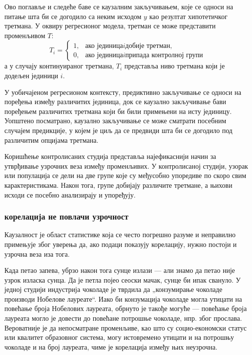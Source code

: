 \documentclass[12pt, a4paper]{article}
\begin{document}
Ово поглавље и следеће баве се каузалним закључивањем, које се односи на питање шта би се догодило са неким исходом $y$ као резултат хипотетичког третмана.
У оквиру регресионог модела, третман се може представити променљивом $T$:
$$
T_i =
\begin{cases}
1, & \text{ако јединица} i \text{добије третман},\\
0, & \text{ако јединица} i \text{припада контролној групи}
\end{cases}
$$
а у случају континуираног третмана, $T_i$ представља ниво третмана који је додељен јединици $i$.

У уобичајеном регресионом контексту, предиктивно закључивање се односи на поређења између различитих јединица, док се каузално закључивање бави 
поређењем различитих третмана који би били примењени на исту јединицу. Уопштено посматрано, каузално закључивање се може сматрати посебним случајем предикције, 
у којем је циљ да се предвиди шта би се догодило под различитим опцијама третмана.

Коришћење контролисаних студија представља најефикаснији начин за утврђивање узрочних веза између променљивих. У контролисаној студији, узорак или популација 
се дели на две групе које су међусобно упоредиве по скоро свим карактеристикама. Након тога, групе добијају различите третмане, а њихови исходи се посебно 
анализирају и упоређују.

\subsubsection{корелација не повлачи узрочност}
Каузалност је област статистике која се често погрешно разуме и неправилно примењује због уверења да, ако подаци показују корелацију, 
нужно постоји и узрочна веза иза тога.

Када петао запева, убрзо након тога сунце излази — али знамо да петао није узрок изласка сунца. Да је петла појео сеоски мачак, сунце би ипак свануло.
У једној студији индустрија чоколаде је тврдила да „конзумирање чоколаде производи Нобелове лауреате“. Иако би конзумација чоколаде могла утицати на повећање броја 
Нобелових лауреата, обрнуто је такође могуће — повећање броја лауреата могло је довести до повећане потрошње чоколаде, нпр. због прослава. Вероватније је да 
непосматране променљиве, као што су социо-економски статус или квалитет образовног система, могу истовремено утицати и на потрошњу чоколаде и на број лауреата, чиме 
је корелација између њих неузрочна. 
\end{document}
